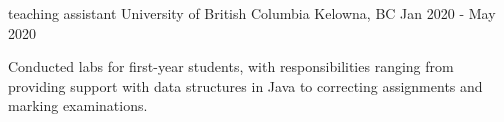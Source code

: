 \begin{cventries}

  \cventry
    {teaching assistant} %
    {University of British Columbia} %
    {Kelowna, BC} %
    {Jan 2020 - May 2020} %
    {
      \begin{cvitems} %
        \item {Conducted labs for first-year students, with responsibilities ranging from providing support with data structures in Java to correcting assignments and marking examinations.}
      \end{cvitems}
    }


\end{cventries}
